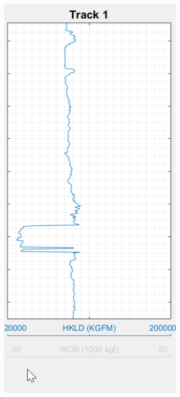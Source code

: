 \documentclass[12pt,a4paper,oneside]{report}
\begin{document}
\begin{figure}[H]
\begin{subfigure}[b]{0.31\textwidth}
    \caption{}
    \label{fig:f1}
  \end{subfigure}
  \hfill
  \begin{subfigure}[b]{0.31\textwidth}
    \includegraphics[width=\textwidth]{fig/2_hide.png}

\end{subfigure}
\end{figure}
\end{document}
